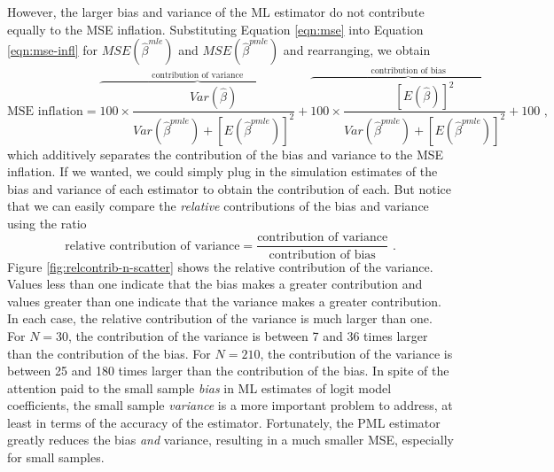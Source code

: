 \documentclass[12pt]{article}
\begin{document}
However, the larger bias and variance of the ML estimator do not contribute equally to the MSE inflation.
Substituting Equation \ref{eqn:mse} into Equation \ref{eqn:mse-infl} for $MSE(\hat{\beta}^{mle})$ and $MSE(\hat{\beta}^{pmle})$ and rearranging, we obtain
\begin{equation}
\text{MSE inflation} = \overbrace{100 \times \dfrac{Var(\hat{\beta})}{Var(\hat{\beta}^{pmle}) + [E(\hat{\beta}^{pmle})]^2}}^{\text{contribution of variance}} + \overbrace{100 \times \dfrac{[E(\hat{\beta})]^2}{Var(\hat{\beta}^{pmle}) + [E(\hat{\beta}^{pmle})]^2}}^{\text{contribution of bias}}  + 100 \text{ ,} \nonumber
\end{equation}
\noindent which additively separates the contribution of the bias and variance to the MSE inflation.
If we wanted, we could simply plug in the simulation estimates of the bias and variance of each estimator to obtain the contribution of each.
But notice that we can easily compare the \textit{relative} contributions of the bias and variance using the ratio
\begin{equation}\label{eqn:rel-contrib}
\text{relative contribution of variance} = \dfrac{\text{contribution of variance}}{\text{contribution of bias}} \text{ .}
\end{equation}
\noindent Figure \ref{fig:relcontrib-n-scatter} shows the relative contribution of the variance.
Values less than one indicate that the bias makes a greater contribution and values greater than one indicate that the variance makes a greater contribution.
In each case, the relative contribution of the variance is much larger than one.
For $N = 30$, the contribution of the variance is between 7 and 36 times larger than the contribution of the bias.
For $N = 210$, the contribution of the variance is between 25 and 180 times larger than the contribution of the bias.
In spite of the attention paid to the small sample \textit{bias} in ML estimates of logit model coefficients, the small sample \textit{variance} is a more important problem to address, at least in terms of the accuracy of the estimator.
Fortunately, the PML estimator greatly reduces the bias \textit{and} variance, resulting in a much smaller MSE, especially for small samples.
\end{document}
